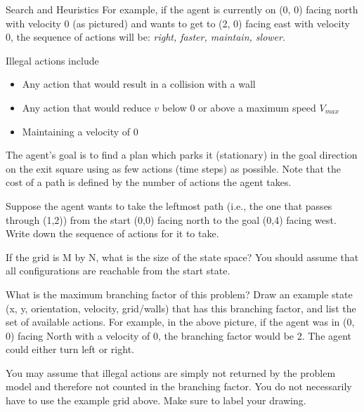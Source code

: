 \begin{problem} {Search and Heuristics}
For example, if the agent is currently on (0, 0) facing north with velocity 0 (as pictured) and wants to get to (2, 0) facing east with velocity 0, the sequence of actions will be: \textit{right, faster, maintain, slower}.

Illegal actions include
\begin{itemize}[noitemsep,topsep=0pt]
    \item Any action that would result in a collision with a wall
    \item Any action that would reduce $v$ below 0 or above a maximum speed $V_{max}$ 
    \item Maintaining a velocity of 0
\end{itemize}

The agent’s goal is to find a plan which parks it (stationary) in the goal direction on the exit square using as few actions (time steps) as possible. Note that the cost of a path is defined by the number of actions the agent takes.

\begin{question}[2] Suppose the agent wants to take the leftmost path (i.e., the one that passes through (1,2)) from the start (0,0) facing north to the goal (0,4) facing west. Write down the sequence of actions for it to take.


\end{question}

\newpage

\begin{question}[2]
If the grid is M by N, what is the size of the state space? You should assume that all configurations are reachable from the start state.


\end{question}

\begin{question}[4] 
What is the maximum branching factor of this problem?
Draw an example state (x, y, orientation, velocity, grid/walls) that has this branching factor, and list the set of available actions. For example, in the above picture, if the agent was in (0, 0) facing North with a velocity of 0, the branching factor would be 2. The agent could either turn left or right.

You may assume that illegal actions are simply not returned by the problem model and therefore not counted in the branching factor. You do not necessarily have to use the example grid above. Make sure to label your drawing.


\end{question}
\end{problem}
